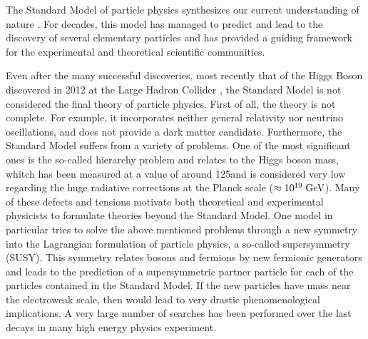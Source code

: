 The Standard Model of particle physics synthesizes our current understanding of nature \cite{Spiesberger:2000ks}. For decades, this model has managed to predict and lead to the discovery of several elementary particles and has provided a guiding framework for the experimental and theoretical scientific communities. 

Even after the many successful discoveries, most recently that of the Higgs Boson discovered in 2012 at the Large Hadron Collider \cite{Aad:2012tfa,Chatrchyan:2012xdj}, the Standard Model is not considered the final theory of particle physics. First of all, the theory is not complete. For example, it incorporates neither general relativity nor neutrino oscillations, and does not provide a dark matter candidate. Furthermore, the Standard Model suffers from a variety of problems. One of the most significant ones is the so-called hierarchy problem and relates to the Higgs boson mass, whitch has been measured at a value of around 125\gev and is considered very low regarding the huge radiative corrections at the Planck scale ($\approx 10^{19}\;\text{Ge}\kern-0.06667em\text{V}$). Many of these defects and tensions motivate both theoretical and experimental physicists to formulate theories beyond the Standard Model. One model in particular tries to solve the above mentioned problems through a new symmetry into the Lagrangian formulation of particle physics, a so-called supersymmetry (SUSY). This symmetry relates bosons and fermions by new fermionic generators and leads to the prediction of a supersymmetric partner particle for each of the particles contained in the Standard Model. If the new particles have mass near the electroweak scale, then would lead to very drastic phenomenological implications. A very large number of searches has been performed over the last decays in many high energy physics experiment. 

